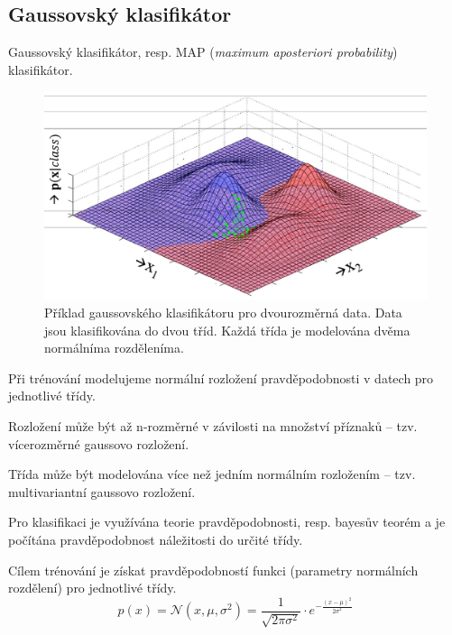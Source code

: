 \subsection{Gaussovský klasifikátor}

\begin{compactitem}
    \item Gaussovský klasifikátor, resp. MAP (\textit{maximum aposteriori probability}) klasifikátor.

    \begin{figure}[H]
        \centering
        \includegraphics[width=0.9\linewidth]{gauss_classification.pdf}
        \caption{Příklad gaussovského klasifikátoru pro dvourozměrná data. Data jsou klasifikována do dvou tříd. Každá třída je modelována dvěma normálníma rozděleníma.}
    \end{figure}

    \item Při trénování modelujeme normální rozložení pravděpodobnosti v datech pro jednotlivé třídy. \begin{compactitem}
        \item Rozložení může být až n-rozměrné v závilosti na množství příznaků -- tzv. vícerozměrné gaussovo rozložení.
        \item Třída může být modelována více než jedním normálním rozložením -- tzv. multivariantní gaussovo rozložení.
    \end{compactitem}

    \item Pro klasifikaci je využívána teorie pravděpodobnosti, resp. bayesův teorém a je počítána pravděpodobnost náležitosti do určité třídy.

    \item Cílem trénování je získat pravděpodobností funkci (parametry normálních rozdělení) pro jednotlivé třídy.
    $${\displaystyle p(x) = \mathcal{N}(x, \mu, \sigma^2) = \frac{1}{\sqrt{2 \pi \sigma^2}} \cdot e^{- \frac{(x - \mu)^2}{2 \sigma^2}} }$$


\end{compactitem}
